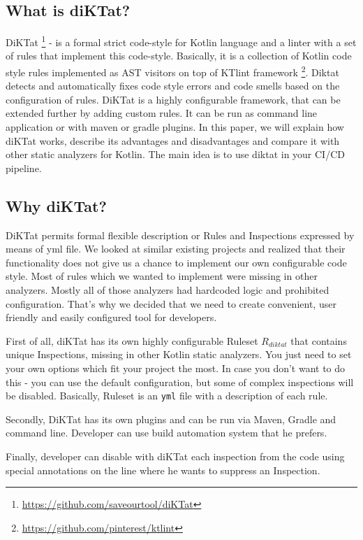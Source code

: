 \subsection{What is diKTat?}
DiKTat \footnote{\url{https://github.com/saveourtool/diKTat}} - is a formal strict code-style for Kotlin language and a linter with a set of rules that implement this code-style. Basically, it is a collection of Kotlin code style rules implemented as AST visitors on top of KTlint framework \footnote{\url{https://github.com/pinterest/ktlint}}. Diktat detects and automatically fixes code style errors and code smells based on the configuration of rules. DiKTat is a highly configurable framework, that can be extended further by adding custom rules. It can be run as command line application or with maven or gradle plugins. In this paper, we will explain how diKTat works, describe its advantages and disadvantages and compare it with other static analyzers for Kotlin. The main idea is to use diktat in your CI/CD pipeline.

\subsection{Why diKTat?}
DiKTat permits formal flexible description or Rules and Inspections expressed by means of yml file. We looked at similar existing projects and realized that their functionality does not give us a chance to implement our own configurable code style. Most of rules which we wanted to implement were missing in other analyzers. Mostly all of those analyzers had hardcoded logic and prohibited configuration. That’s why we decided that we need to create convenient, user friendly and easily configured tool for developers.

First of all, diKTat has its own highly configurable Ruleset $R_{diktat}$ that contains unique Inspections, missing in other Kotlin static analyzers. You just need to set your own options which fit your project the most. In case you don't want to do this - you can use the default configuration, but some of complex inspections will be disabled. Basically, Ruleset is an \texttt{yml} file with a description of each rule.

Secondly, DiKTat has its own plugins and can be run via Maven, Gradle and command line. Developer can use build automation system that he prefers.

Finally, developer can disable with diKTat each inspection from the code using special annotations on the line where he wants to suppress an Inspection.